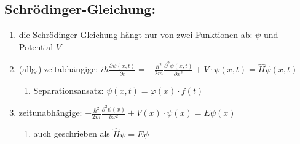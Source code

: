 \subsection{Schrödinger-Gleichung:}\label{schroedinger}
\begin{enumerate}
    \item die Schrödinger-Gleichung hängt nur von zwei Funktionen ab: $\psi$ und Potential $V$
    \item (allg.) zeitabhängige: $i\hbar\frac{\partial\psi\left(x,t\right)}{\partial t}=-\frac{\hbar^{2}}{2m}\frac{\partial^{2}\psi\left(x,t\right)}{\partial x^{2}}+V\cdot\psi\left(x,t\right)=\hat{H}\psi\left(x,t\right)$
    \begin{enumerate}
        \item Separationsansatz: $\psi(x,t)=\varphi(x)\cdot f(t)$
    \end{enumerate}


    \item zeitunabhängige: $-\frac{\hbar^{2}}{2m}\frac{\partial^{2}\psi\left(x\right)}{\partial x^{2}}+V(x)\cdot\psi\left(x\right)=E\psi\left(x\right)$ 
    \begin{enumerate}
        \item auch geschrieben als $\hat{H}\psi=E\psi$
    \end{enumerate}
\end{enumerate}

